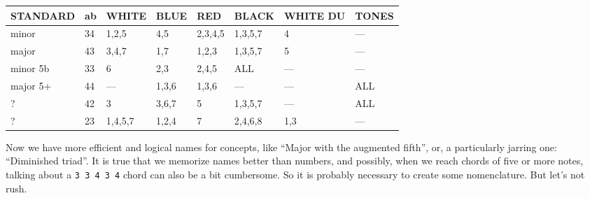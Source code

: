 \documentclass[]{report}
\begin{document}
\begin{table}[H]
\centering
\begingroup\setlength{\tabcolsep}{3pt}\small
	\begin{tabular}{|l|l|l|l|l|l|l|l|}
\hline
STANDARD & ab & WHITE & BLUE & RED & BLACK & WHITE DU & TONES \\
\hline
minor& 34 & 1,2,5 & 4,5 & 2,3,4,5 & 1,3,5,7 & 4 & --- \\
\hline
major & 43 & 3,4,7 & 1,7 & 1,2,3 & 1,3,5,7 & 5 & --- \\
\hline
minor 5b & 33 & 6 & 2,3 & 2,4,5 & ALL & --- & --- \\
\hline
major 5+ & 44 & --- & 1,3,6 & 1,3,6 & --- & --- & ALL \\
\hline
? & 42 & 3 & 3,6,7 & 5 & 1,3,5,7 & --- & ALL \\
\hline
? & 23 & 1,4,5,7 & 1,2,4 & 7 & 2,4,6,8 & 1,3 & --- \\
\hline
\end{tabular}
	\endgroup
\end{table}
Now we have more efficient and logical names for concepts, like ``Major with the augmented fifth'', or, a particularly jarring one: ``Diminished triad''.
It is true that we memorize names better than numbers, and possibly, when we reach chords of five or more notes, talking about a \texttt{3\ 3\ 4\ 3\ 4} chord can also be a bit cumbersome. So it is probably necessary to create some nomenclature. But let's not rush.
\end{document}
